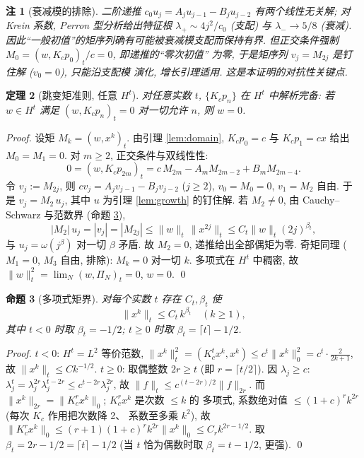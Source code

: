 \documentclass[UTF8]{ctexart}
\newtheorem{theorem}{定理}[section]
\newtheorem{proposition}[theorem]{命题}
\newtheorem{remark}[theorem]{注}
\begin{document}
\begin{remark}[衰减模的排除]\label{rem:decay}
	二阶递推 $c_0 u_j = A_j u_{j-1} - B_j u_{j-2}$ 有两个线性无关解;
	对 Krein 系数, Perron 型分析给出特征根
	$\lambda_+ \sim 4j^2/c_0$ (支配) 与 $\lambda_- \to 5/8$ (衰减).
	因此``一般初值''的矩序列确有可能被衰减模支配而保持有界.
	但正交条件强制 $M_0 = (w, K_c p_0)_t / c = 0$, 即递推的``零次初值''
	为零, 于是矩序列 $v_j = M_{2j}$ 是钉住解 ($v_0 = 0$), 只能沿支配模
	演化, 增长引理适用. 这是本证明的对抗性关键点.
\end{remark}

\begin{theorem}[跳变矩准则, 任意 $H^t$]\label{thm:jump}
	对任意实数 $t$, $\{K_c p_n\}$ 在 $H^t$ 中解析完备:
	若 $w \in H^t$ 满足 $(w, K_c p_n)_t = 0$ 对一切允许 $n$, 则 $w = 0$.
\end{theorem}

\begin{proof}
	设矩 $M_k = (w, x^k)_t$. 由引理 \ref{lem:domain},
	$K_c p_0 = c$ 与 $K_c p_1 = cx$ 给出 $M_0 = M_1 = 0$.
	对 $m \ge 2$, 正交条件与双线性性:
	\[
		0 = (w, K_c p_{2m})_t
		= c\, M_{2m} - A_m M_{2m-2} + B_m M_{2m-4}.
	\]
	令 $v_j := M_{2j}$, 则 $c v_j = A_j v_{j-1} - B_j v_{j-2}$
	($j \ge 2$), $v_0 = M_0 = 0$, $v_1 = M_2$ 自由. 于是
	$v_j = M_2\, u_j$, 其中 $u$ 为引理 \ref{lem:growth} 的钉住解.
	若 $M_2 \ne 0$, 由 Cauchy--Schwarz 与范数界 (命题 \ref{prop:norm}),
	\[
		|M_2|\, u_j = |v_j| = |M_{2j}| \le \|w\|_t\, \|x^{2j}\|_t
		\le C_t \|w\|_t (2j)^{\beta_t},
	\]
	与 $u_j = \omega(j^\beta)$ 对一切 $\beta$ 矛盾. 故 $M_2 = 0$,
	递推给出全部偶矩为零. 奇矩同理 ($M_1 = 0$, $M_3$ 自由, 排除):
	$M_k = 0$ 对一切 $k$. 多项式在 $H^t$ 中稠密, 故
	$\|w\|_t^2 = \lim_N (w, \Pi_N)_t = 0$, $w = 0$. \qed
\end{proof}

\begin{proposition}[多项式矩界]\label{prop:norm}
	对每个实数 $t$ 存在 $C_t, \beta_t$ 使
	\[
		\|x^k\|_t \le C_t\, k^{\beta_t} \quad (k \ge 1),
	\]
	其中 $t < 0$ 时取 $\beta_t = -1/2$; $t \ge 0$ 时取
	$\beta_t = \lceil t \rceil - 1/2$.
\end{proposition}

\begin{proof}
	$t < 0$: $H^t = L^2$ 等价范数, $\|x^k\|_t^2
	= (K_c^t x^k, x^k) \le c^t \|x^k\|_0^2 = c^t \cdot \frac{2}{2k+1}$,
	故 $\|x^k\|_t \le C k^{-1/2}$.
	$t \ge 0$: 取偶整数 $2r \ge t$ (即 $r = \lceil t/2 \rceil$). 因
	$\lambda_j \ge c$: $\lambda_j^t = \lambda_j^{2r}\lambda_j^{t-2r}
	\le c^{t-2r}\lambda_j^{2r}$, 故 $\|f\|_t \le c^{(t-2r)/2}\|f\|_{2r}$.
	而 $\|x^k\|_{2r} = \|K_c^r x^k\|_0$; $K_c^r x^k$ 是次数 $\le k$ 的
	多项式, 系数绝对值 $\le (1+c)^r k^{2r}$ (每次 $K_c$ 作用把次数降 2、
	系数至多乘 $k^2$), 故
	$\|K_c^r x^k\|_0 \le (r+1)(1+c)^r k^{2r}\|x^k\|_0
	\le C_r k^{2r-1/2}$. 取 $\beta_t = 2r - 1/2 = \lceil t\rceil - 1/2$ (当
	$t$ 恰为偶数时取 $\beta_t = t - 1/2$, 更强). \qed
\end{proof}
\end{document}
